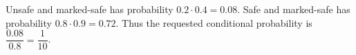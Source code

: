 Unsafe and marked-safe has probability $0.2\cdot0.4=0.08$. Safe and marked-safe has probability $0.8\cdot0.9=0.72$. Thus the requested conditional probability is $\dfrac{0.08}{0.8}=\boxed{\dfrac{1}{10}}$.
